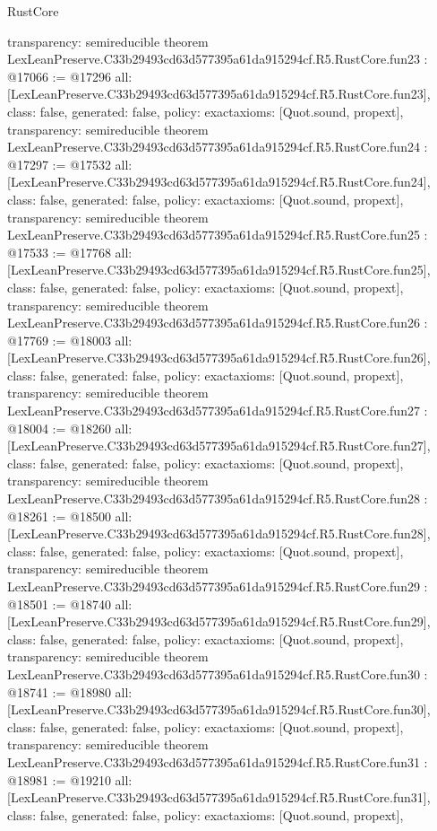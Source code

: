 \begin{lexlean}{RustCore}
\begin{coremodule}
{  transparency: semireducible
}
theorem LexLeanPreserve.C33b29493cd63d577395a61da915294cf.R5.RustCore.fun23 : @17066 := @17296 {
  all: [LexLeanPreserve.C33b29493cd63d577395a61da915294cf.R5.RustCore.fun23],
  class: false,
  generated: false,
  policy: exact{axioms: [Quot.sound, propext]},
  transparency: semireducible
}
theorem LexLeanPreserve.C33b29493cd63d577395a61da915294cf.R5.RustCore.fun24 : @17297 := @17532 {
  all: [LexLeanPreserve.C33b29493cd63d577395a61da915294cf.R5.RustCore.fun24],
  class: false,
  generated: false,
  policy: exact{axioms: [Quot.sound, propext]},
  transparency: semireducible
}
theorem LexLeanPreserve.C33b29493cd63d577395a61da915294cf.R5.RustCore.fun25 : @17533 := @17768 {
  all: [LexLeanPreserve.C33b29493cd63d577395a61da915294cf.R5.RustCore.fun25],
  class: false,
  generated: false,
  policy: exact{axioms: [Quot.sound, propext]},
  transparency: semireducible
}
theorem LexLeanPreserve.C33b29493cd63d577395a61da915294cf.R5.RustCore.fun26 : @17769 := @18003 {
  all: [LexLeanPreserve.C33b29493cd63d577395a61da915294cf.R5.RustCore.fun26],
  class: false,
  generated: false,
  policy: exact{axioms: [Quot.sound, propext]},
  transparency: semireducible
}
theorem LexLeanPreserve.C33b29493cd63d577395a61da915294cf.R5.RustCore.fun27 : @18004 := @18260 {
  all: [LexLeanPreserve.C33b29493cd63d577395a61da915294cf.R5.RustCore.fun27],
  class: false,
  generated: false,
  policy: exact{axioms: [Quot.sound, propext]},
  transparency: semireducible
}
theorem LexLeanPreserve.C33b29493cd63d577395a61da915294cf.R5.RustCore.fun28 : @18261 := @18500 {
  all: [LexLeanPreserve.C33b29493cd63d577395a61da915294cf.R5.RustCore.fun28],
  class: false,
  generated: false,
  policy: exact{axioms: [Quot.sound, propext]},
  transparency: semireducible
}
theorem LexLeanPreserve.C33b29493cd63d577395a61da915294cf.R5.RustCore.fun29 : @18501 := @18740 {
  all: [LexLeanPreserve.C33b29493cd63d577395a61da915294cf.R5.RustCore.fun29],
  class: false,
  generated: false,
  policy: exact{axioms: [Quot.sound, propext]},
  transparency: semireducible
}
theorem LexLeanPreserve.C33b29493cd63d577395a61da915294cf.R5.RustCore.fun30 : @18741 := @18980 {
  all: [LexLeanPreserve.C33b29493cd63d577395a61da915294cf.R5.RustCore.fun30],
  class: false,
  generated: false,
  policy: exact{axioms: [Quot.sound, propext]},
  transparency: semireducible
}
theorem LexLeanPreserve.C33b29493cd63d577395a61da915294cf.R5.RustCore.fun31 : @18981 := @19210 {
  all: [LexLeanPreserve.C33b29493cd63d577395a61da915294cf.R5.RustCore.fun31],
  class: false,
  generated: false,
  policy: exact{axioms: [Quot.sound, propext]},
}
\end{coremodule}
\end{lexlean}
